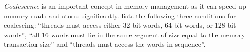 \textit{Coalescence} is an important concept in memory management as it can speed up memory reads and stores significantly. \cite{cuda} lists the following three conditions for coalescing: ``threads must access either 32-bit words, 64-bit words, or 128-bit words'', ``all 16 words must lie in the same segment of size equal to the memory transaction size'' and ``threads must access the words in sequence''. 

